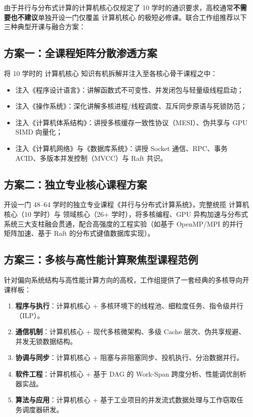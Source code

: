 由于并行与分布式计算的计算机核心仅规定了 10 学时的通识要求，高校通常\textbf{不需要也不建议}单独开设一门仅覆盖 计算机核心 的极短必修课。联合工作组推荐以下三种典型开课与融合方案：

\subsection{方案一：全课程矩阵分散渗透方案}
将 10 学时的 计算机核心 知识有机拆解并注入至各核心骨干课程之中：
\begin{itemize}
    \item 注入《程序设计语言》：讲解函数式不可变性、并发闭包与轻量级线程启动；
    \item 注入《操作系统》：深化讲解多核进程/线程调度、互斥同步原语与死锁防范；
    \item 注入《计算机体系结构》：讲授多核缓存一致性协议（MESI）、伪共享与 GPU SIMD 向量化；
    \item 注入《计算机网络》与《数据库系统》：讲授 Socket 通信、RPC、事务 ACID、多版本并发控制（MVCC）与 Raft 共识。
\end{itemize}

\subsection{方案二：独立专业核心课程方案}
开设一门 48--64 学时的独立专业课程《并行与分布式计算系统》，完整统揽 计算机核心（10 学时）与 领域核心（26+ 学时），将多核编程、GPU 异构加速与分布式系统三大支柱融会贯通，配合高强度的工程实验（如基于 OpenMP/MPI 的并行矩阵加速、基于 Raft 的分布式键值数据库实现）。

\subsection{方案三：多核与高性能计算聚焦型课程范例}
针对偏向系统结构与高性能计算方向的高校，工作组提供了一套经典的多核导向开课样板：
\begin{enumerate}
    \item \textbf{程序与执行}：计算机核心 + 多核环境下的线程池、细粒度任务、指令级并行（ILP）。
    \item \textbf{通信机制}：计算机核心 + 现代多核微架构、多级 Cache 层次、伪共享规避、并发无锁数据结构。
    \item \textbf{协调与同步}：计算机核心 + 阻塞与非阻塞同步、投机执行、分治数据并行。
    \item \textbf{软件工程}：计算机核心 + 基于 DAG 的 Work-Span 跨度分析、性能调优剖析器实战。
    \item \textbf{算法与应用}：计算机核心 + 基于工业项目的并发流式数据处理与工作窃取任务调度器研发。
\end{enumerate}

